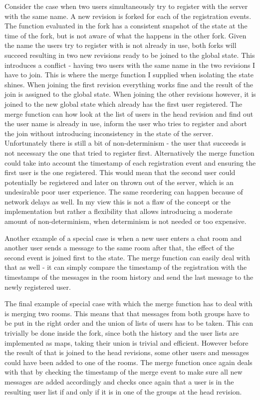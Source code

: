 \documentclass[12pt,twoside,notitlepage]{report}
\begin{document}
Consider the case when two users simultaneously try to register with the server with the same name. A new revision is forked for each of the registration events. The function evaluated in the fork has a consistent snapshot of the state at the time of the fork, but is not aware of what the happens in the other fork. Given the name the users try to register with is not already in use, both forks will succeed resulting in two new revisions ready to be joined to the global state. This introduces a conflict - having two users with the same name in the two revisions I have to join. This is where the merge function I supplied when isolating the state shines. When joining the first revision everything works fine and the result of the join is assigned to the global state. When joining the other revisions however, it is joined to the new global state which already has the first user registered. The merge function can how look at the list of users in the head revision and find out the user name is already in use, inform the user who tries to register and abort the join without introducing inconsistency in the state of the server. Unfortunately there is still a bit of non-determinism - the user that succeeds is not necessary the one that tried to register first. Alternatively the merge function could take into account the timestamp of each registration event and ensuring the first user is the one registered. This would mean that the second user could potentially be registered and later on thrown out of the server, which is an undesirable poor user experience. The same reordering can happen because of network delays as well. In my view this is not a flaw of the concept or the implementation but rather a flexibility that allows introducing a moderate amount of non-determinism, when determinism is not needed or too expensive.     

Another example of a special case is when a new user enters a chat room and another user sends a message to the same room after that, the effect of the second event is joined first to the state. The merge function can easily deal with that as well - it can simply compare the timestamp of the registration with the timestamps of the messages in the room history and send the last message to the newly registered user.

The final example of special case with which the merge function has to deal with is merging two rooms. This means that that messages from both groups have to be put in the right order and the union of lists of users has to be taken. This can trivially be done inside the fork, since both the history and the user lists are implemented as maps, taking their union is trivial and efficient. However before the result of that is joined to the head revisions, some other users and messages could have been added to one of the rooms. The merge function once again deals with that by checking the timestamp of the merge event to make sure all new messages are added accordingly and checks once again that a user is in the resulting user list if and only if it is in one of the groups at the head revision.
\end{document}
